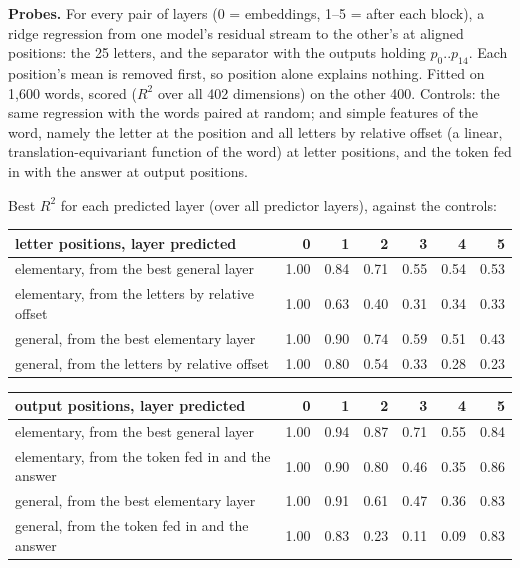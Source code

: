 \documentclass[paper=a4,fontsize=11pt,DIV=11,parskip=half,headings=small,numbers=noendperiod]{scrartcl}
\DeclareRobustCommand{\lead}[1]{\textsf{\bfseries\color{accent}#1}}
\DeclareRobustCommand{\hdr}[1]{\textsf{\bfseries #1}}
\begin{document}
\lead{Probes.} For every pair of layers (0 = embeddings, 1–5 = after each block), a ridge regression from one
model’s residual stream to the other’s at aligned positions: the 25 letters, and the separator with the outputs
holding $p_0..p_{14}$. Each position’s mean is removed first, so position alone explains nothing. Fitted on
1,600 words, scored ($R^2$ over all 402 dimensions) on the other 400. Controls: the same regression with the
words paired at random; and simple features of the word, namely the letter at the position and all letters by
relative offset (a linear, translation-equivariant function of the word) at letter positions, and the token fed
in with the answer at output positions.

Best $R^2$ for each predicted layer (over all predictor layers), against the controls:

\begin{center}\small
\begin{tabular}{@{}>{\raggedright\arraybackslash}p{6.2cm} *{6}{r}@{}}
\toprule
\hdr{letter positions, layer predicted} & \hdr{0} & \hdr{1} & \hdr{2} & \hdr{3} & \hdr{4} & \hdr{5} \\
\midrule
elementary, from the best general layer & 1.00 & 0.84 & 0.71 & 0.55 & 0.54 & 0.53 \\
elementary, from the letters by relative offset & 1.00 & 0.63 & 0.40 & 0.31 & 0.34 & 0.33 \\
general, from the best elementary layer & 1.00 & 0.90 & 0.74 & 0.59 & 0.51 & 0.43 \\
general, from the letters by relative offset & 1.00 & 0.80 & 0.54 & 0.33 & 0.28 & 0.23 \\
\bottomrule
\end{tabular}
\end{center}

\begin{center}\small
\begin{tabular}{@{}>{\raggedright\arraybackslash}p{6.2cm} *{6}{r}@{}}
\toprule
\hdr{output positions, layer predicted} & \hdr{0} & \hdr{1} & \hdr{2} & \hdr{3} & \hdr{4} & \hdr{5} \\
\midrule
elementary, from the best general layer & 1.00 & 0.94 & 0.87 & 0.71 & 0.55 & 0.84 \\
elementary, from the token fed in and the answer & 1.00 & 0.90 & 0.80 & 0.46 & 0.35 & 0.86 \\
general, from the best elementary layer & 1.00 & 0.91 & 0.61 & 0.47 & 0.36 & 0.83 \\
general, from the token fed in and the answer & 1.00 & 0.83 & 0.23 & 0.11 & 0.09 & 0.83 \\
\bottomrule
\end{tabular}
\end{center}
\end{document}
